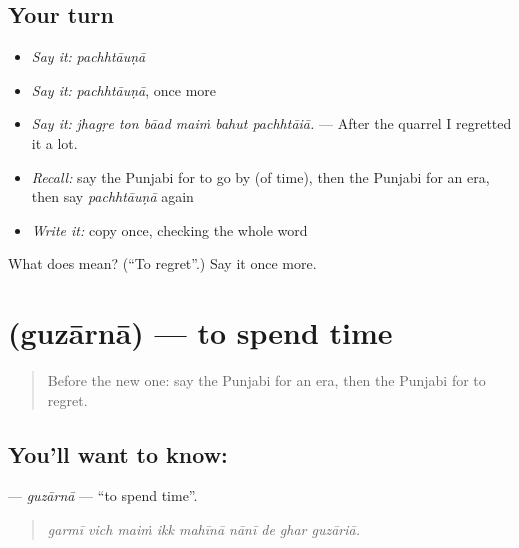 \subsection*{Your turn}
\begin{itemize}
\raggedright
  \item \emph{Say it:} \emph{pachhtāuṇā}
  \item \emph{Say it:} \emph{pachhtāuṇā}, once more
  \item \emph{Say it:} \emph{jhagṛe ton bāad maiṁ bahut pachhtāiā.} — After the quarrel I regretted it a lot.
  \item \emph{Recall:} say the Punjabi for to go by (of time), then the Punjabi for an era, then say \emph{pachhtāuṇā} again
  \item \emph{Write it:} copy \textbf{} once, checking the whole word
\end{itemize}

\begin{tcolorbox}[breakable,colback=teal!4,colframe=teal!35!black,title={Before you move on}]
What does  mean? (\textquotedblleft{}To regret\textquotedblright{}.) Say it once more.
\end{tcolorbox}
\section[\texorpdfstring{\pa{ਗੁਜ਼ਾਰਨਾ} (guzārnā)}{ਗੁਜ਼ਾਰਨਾ (guzārnā)}]{ (guzārnā) — to spend time}

\label{lesson:PA-C317-guzarna}



\begin{quote}
Before the new one: say the Punjabi for an era, then the Punjabi for to regret.
\end{quote}

\subsection*{You'll want to know: }
\textbf{} — \emph{guzārnā} — \textquotedblleft{}to spend time\textquotedblright{}.

\begin{quote}
        
\end{quote}

\begin{quote}
\emph{garmī vich maiṁ ikk mahīnā nānī de ghar guzāriā.}
\end{quote}

